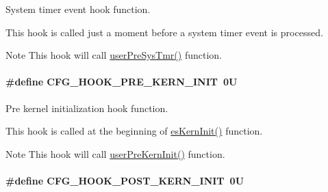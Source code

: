 System timer event hook function. 

This hook is called just a moment before a system timer event is processed. \begin{DoxyNote}{Note}
This hook will call \hyperlink{group__kern__hook_ga9a0d562969acef0121136b11be7b4728}{user\-Pre\-Sys\-Tmr()} function. 
\end{DoxyNote}
\hypertarget{group__template__kern__cfg_ga4093113f2105d2716f86c6509a6e643a}{
\paragraph[{C\-F\-G\-\_\-\-H\-O\-O\-K\-\_\-\-P\-R\-E\-\_\-\-K\-E\-R\-N\-\_\-\-I\-N\-I\-T}]{\setlength{\rightskip}{0pt plus 5cm}\#define C\-F\-G\-\_\-\-H\-O\-O\-K\-\_\-\-P\-R\-E\-\_\-\-K\-E\-R\-N\-\_\-\-I\-N\-I\-T~0\-U}}\label{group__template__kern__cfg_ga4093113f2105d2716f86c6509a6e643a}


Pre kernel initialization hook function. 

This hook is called at the beginning of \hyperlink{group__kern__general_ga9e9ff699d62d6035cd51121bb3140704}{es\-Kern\-Init()} function. \begin{DoxyNote}{Note}
This hook will call \hyperlink{group__kern__hook_gaac77966856c9a299cda4794cbcc87edf}{user\-Pre\-Kern\-Init()} function. 
\end{DoxyNote}
\hypertarget{group__template__kern__cfg_ga85dea823714335c2ec9e9f7750996e83}{
\paragraph[{C\-F\-G\-\_\-\-H\-O\-O\-K\-\_\-\-P\-O\-S\-T\-\_\-\-K\-E\-R\-N\-\_\-\-I\-N\-I\-T}]{\setlength{\rightskip}{0pt plus 5cm}\#define C\-F\-G\-\_\-\-H\-O\-O\-K\-\_\-\-P\-O\-S\-T\-\_\-\-K\-E\-R\-N\-\_\-\-I\-N\-I\-T~0\-U}}\label{group__template__kern__cfg_ga85dea823714335c2ec9e9f7750996e83}


